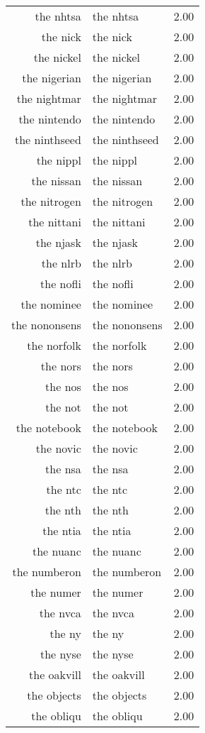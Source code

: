 \begin{table}[ht]
\begin{tabular}{rlr}
  the nhtsa & the nhtsa & 2.00 \\ 
  the nick & the nick & 2.00 \\ 
  the nickel & the nickel & 2.00 \\ 
  the nigerian & the nigerian & 2.00 \\ 
  the nightmar & the nightmar & 2.00 \\ 
  the nintendo & the nintendo & 2.00 \\ 
  the ninthseed & the ninthseed & 2.00 \\ 
  the nippl & the nippl & 2.00 \\ 
  the nissan & the nissan & 2.00 \\ 
  the nitrogen & the nitrogen & 2.00 \\ 
  the nittani & the nittani & 2.00 \\ 
  the njask & the njask & 2.00 \\ 
  the nlrb & the nlrb & 2.00 \\ 
  the nofli & the nofli & 2.00 \\ 
  the nominee & the nominee & 2.00 \\ 
  the nononsens & the nononsens & 2.00 \\ 
  the norfolk & the norfolk & 2.00 \\ 
  the nors & the nors & 2.00 \\ 
  the nos & the nos & 2.00 \\ 
  the not & the not & 2.00 \\ 
  the notebook & the notebook & 2.00 \\ 
  the novic & the novic & 2.00 \\ 
  the nsa & the nsa & 2.00 \\ 
  the ntc & the ntc & 2.00 \\ 
  the nth & the nth & 2.00 \\ 
  the ntia & the ntia & 2.00 \\ 
  the nuanc & the nuanc & 2.00 \\ 
  the numberon & the numberon & 2.00 \\ 
  the numer & the numer & 2.00 \\ 
  the nvca & the nvca & 2.00 \\ 
  the ny & the ny & 2.00 \\ 
  the nyse & the nyse & 2.00 \\ 
  the oakvill & the oakvill & 2.00 \\ 
  the objects & the objects & 2.00 \\ 
  the obliqu & the obliqu & 2.00 \\ 

\end{tabular}
\end{table}
